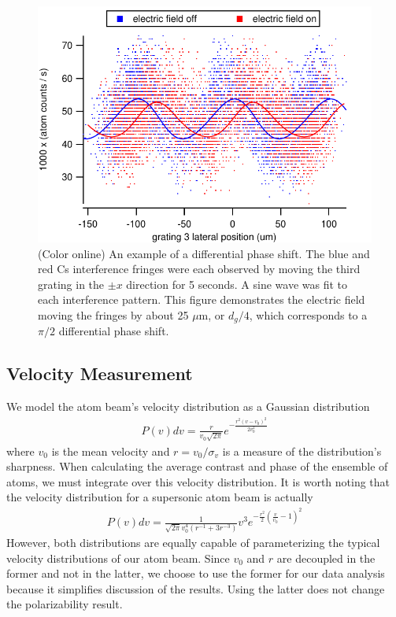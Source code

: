 \documentclass[twocolumn,prl,showpacs,superscriptaddress]{revtex4-1}   %
\begin{document}
\begin{figure}
\includegraphics[width=\linewidth,keepaspectratio]{countsVsGratingPos_150420.pdf}
\caption{\label{phaseShiftExample}(Color online) An example of a differential phase shift. The blue and red Cs interference fringes were each observed by moving the third grating in the $\pm x$ direction for 5 seconds. A sine wave was fit to each interference pattern. This figure demonstrates the electric field moving the fringes by about 25 $\mu$m, or $d_g/4$, which corresponds to a $\pi/2$ differential phase shift.}
\end{figure}

\subsection{Velocity Measurement}

We model the atom beam's velocity distribution as a Gaussian distribution
\begin{align}
	P(v)dv = \frac{r}{v_0\sqrt{2\pi}}e^{-\frac{r^2(v-v_0)^2}{2v_0^2}}
	\label{PvelGaussian}
\end{align}
where $v_0$ is the mean velocity and $r = v_0/\sigma_v$ is a measure of the distribution's sharpness. When calculating the average contrast and phase of the ensemble of atoms, we must integrate over this velocity distribution. It is worth noting that the velocity distribution for a supersonic atom beam is actually
\begin{align}
	P(v)dv = \frac{1}{\sqrt{2\pi}v_0^4(r^{-1}+3r^{-3})}
	v^3
	e^{-\frac{r^2}{2}\left(\frac{v}{v_0}-1\right)^2}
	\label{PvelCubed}
\end{align}
However, both distributions are equally capable of parameterizing the typical velocity distributions of our atom beam. Since $v_0$ and $r$ are decoupled in the former and not in the latter, we choose to use the former for our data analysis because it simplifies discussion of the results. Using the latter does not change the polarizability result. 
\end{document}
